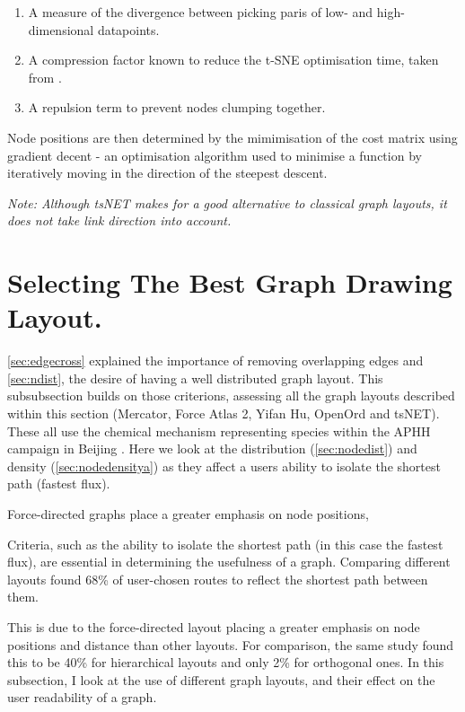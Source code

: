 \begin{enumerate}
    \item A measure of the divergence between picking paris of low- and high-dimensional datapoints.
    \item A compression factor known to reduce the t-SNE optimisation time, taken from \citep{tsnetcompression}.
    \item A repulsion term to prevent nodes clumping together.
\end{enumerate}
    
Node positions are then determined by the mimimisation of the cost matrix using gradient decent - an optimisation algorithm used to minimise a function by iteratively moving in the direction of the steepest descent. 

\textit{Note: Although tsNET makes for a good alternative to classical graph layouts, it does not take link direction into account. }



\section{Selecting The Best Graph Drawing Layout.}

\autoref{sec:edgecross} explained the importance of removing overlapping edges and \autoref{sec:ndist}, the desire of having a well distributed graph layout. This subsubsection builds on those criterions, assessing all the graph layouts described within this section (Mercator, Force Atlas 2, Yifan Hu, OpenOrd and tsNET). These all use the chemical mechanism representing species within the APHH campaign in Beijing \citep{aphh}. Here we look at the distribution (\autoref{sec:nodedist}) and density (\autoref{sec:nodedensitya}) as they affect a users ability to isolate the shortest path (fastest flux).

 Force-directed graphs place a greater emphasis on node positions,





Criteria, such as the ability to isolate the shortest path (in this case the fastest flux), are essential in determining the usefulness of a graph. Comparing different layouts \citep{eyetrack} found 68\% of user-chosen routes to reflect the shortest path between them. 

This is due to the force-directed layout placing a greater emphasis on node positions and distance than other layouts. For comparison, the same study found this to be 40\% for hierarchical layouts and only 2\% for orthogonal ones. In this subsection, I look at the use of different graph layouts, and their effect on the user readability of a graph. 


